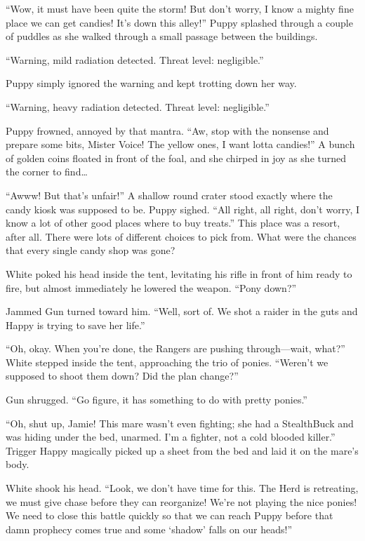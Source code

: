 ``Wow, it must have been quite the storm! But don't worry, I know a mighty fine place we can get candies! It's down this alley!'' Puppy splashed through a couple of puddles as she walked through a small passage between the buildings.

{\mten ``Warning, mild radiation detected. Threat level: negligible.''}

Puppy simply ignored the warning and kept trotting down her way.

{\mten ``Warning, heavy radiation detected. Threat level: negligible.''}

Puppy frowned, annoyed by that mantra. ``Aw, stop with the nonsense and prepare some bits, Mister Voice! The yellow ones, I want lotta candies!'' A bunch of golden coins floated in front of the foal, and she chirped in joy as she turned the corner to find\dots

``Awww! But that's unfair!'' A shallow round crater stood exactly where the candy kiosk was supposed to be. Puppy sighed. ``All right, all right, don't worry, I know a lot of other good places where to buy treats.'' This place was a resort, after all. There were lots of different choices to pick from. What were the chances that every single candy shop was gone?



\horizonline


White poked his head inside the tent, levitating his rifle in front of him ready to fire, but almost immediately he lowered the weapon. ``Pony down?''

Jammed Gun turned toward him. ``Well, sort of. We shot a raider in the guts and Happy is trying to save her life.''

``Oh, okay. When you're done, the Rangers are pushing through---wait, what?'' White stepped inside the tent, approaching the trio of ponies. ``Weren't we supposed to shoot them down? Did the plan change?''

Gun shrugged. ``Go figure, it has something to do with pretty ponies.''

``Oh, shut up, Jamie! This mare wasn't even fighting; she had a StealthBuck and was hiding under the bed, unarmed. I'm a fighter, not a cold blooded killer.'' Trigger Happy magically picked up a sheet from the bed and laid it on the mare's body.

White shook his head. ``Look, we don't have time for this. The Herd is retreating, we must give chase before they can reorganize! We're not playing the nice ponies! We need to close this battle quickly so that we can reach Puppy before that damn prophecy comes true and some `shadow' falls on our heads!''


